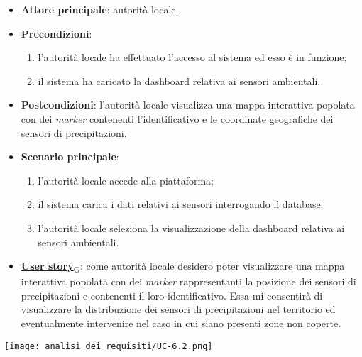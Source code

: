 \begin{itemize}
	\item \textbf{Attore principale}: autorità locale.
	\item \textbf{Precondizioni}:
	      \begin{enumerate}
		      \item l'autorità locale ha effettuato l'accesso al sistema ed esso è in funzione;
		      \item il sistema ha caricato la dashboard relativa ai sensori ambientali.
	      \end{enumerate}
	\item \textbf{Postcondizioni}: l'autorità locale visualizza una mappa interattiva popolata con dei \textit{marker} contenenti l'identificativo e le coordinate geografiche dei sensori di precipitazioni.
	\item \textbf{Scenario principale}:
	      \begin{enumerate}
		      \item l'autorità locale accede alla piattaforma;
		      \item il sistema carica i dati relativi ai sensori interrogando il database;
		      \item l'autorità locale seleziona la visualizzazione della dashboard relativa ai sensori ambientali.
	      \end{enumerate}
	\item \href{https://7last.github.io/docs/rtb/documentazione-interna/glossario\#user-story}{\textbf{User story}\textsubscript{G}}:
	      come autorità locale desidero poter visualizzare una mappa interattiva popolata con dei \textit{marker} rappresentanti la posizione dei sensori di precipitazioni
	      e contenenti il loro identificativo. Essa mi consentirà di visualizzare la distribuzione dei sensori di precipitazioni nel territorio ed
	      eventualmente intervenire nel caso in cui siano presenti zone non coperte.
\end{itemize}
\begin{center}
	\texttt{[image: analisi\_dei\_requisiti/UC-6.2.png]}
\end{center}


